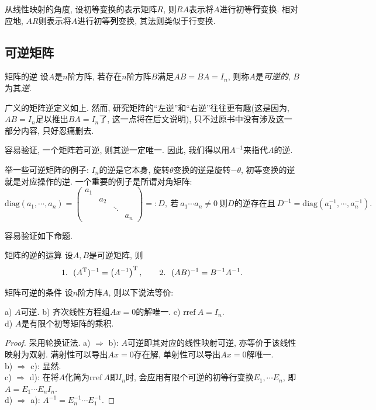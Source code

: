 从线性映射的角度, 设初等变换的表示矩阵$R$, 则$RA$表示将$A$进行初等\textbf{行}变换. 相对应地, $AR$则表示将$A$进行初等\textbf{列}变换, 其法则类似于行变换. 

\subsection{可逆矩阵}

\begin{definition}{矩阵的逆}
	设$A$是$n$阶方阵, 若存在$n$阶方阵$B$满足$AB=BA=I_n$, 则称$A$是\textit{可逆的}, $B$为其\textit{逆}. 
\end{definition}
\begin{remark}
	广义的矩阵逆定义如上. 然而, 研究矩阵的“左逆”和“右逆”往往更有趣(这是因为, $AB=I_n$足以推出$BA=I_n$了, 这一点将在后文说明), 只不过原书中没有涉及这一部分内容, 只好忍痛删去. 
\end{remark}

容易验证, 一个矩阵若可逆, 则其逆一定唯一. 因此, 我们得以用$A^{-1}$来指代$A$的逆. 

举一些可逆矩阵的例子: $I_n$的逆是它本身, 旋转$\theta$变换的逆是旋转$-\theta$, 初等变换的逆就是对应操作的逆. 一个重要的例子是所谓对角矩阵: $$\textrm{diag} (a_1, \cdots ,a_n) = \left( \begin{smallmatrix}
	 a_1 &   &   &   \\
	   & a_2 &   &   \\
	   &   &\ddots &   \\
	   &   &   & a_n     
\end{smallmatrix} \right)=:D,~\textit{若}~a_1\cdots a_n \neq 0~\textit{则$D$的逆存在且} ~D^{-1} = \textrm{diag} (a_1^{-1},\cdots ,a_n^{-1}). $$

容易验证如下命题. 

\begin{proposition}{矩阵的逆的运算}
	设$A,B$是可逆矩阵, 则$$1.~~(A^{\operatorname{T}})^{-1} = \left(A^{-1}\right)^{\operatorname{T}} ,\qquad 2.~~(AB)^{-1}=B^{-1}A^{-1}.$$
\end{proposition}

\begin{proposition}{矩阵可逆的条件}
	设$n$阶方阵$A$, 则以下说法等价:
	\begin{center}
		a) $A$可逆. \qquad b) 齐次线性方程组$Ax=0$的解唯一. \qquad c) $\textrm{rref}~ A=I_n$. \\ d) $A$是有限个初等矩阵的乘积. 
	\end{center}
\end{proposition}
\begin{proof}
	采用轮换证法. 
	a) $\Rightarrow $ b): $A$可逆即其对应的线性映射可逆, 亦等价于该线性映射为双射. 满射性可以导出$Ax=0$存在解, 单射性可以导出$Ax=0$解唯一. \\
	b) $\Rightarrow $ c): 显然. \\
	c) $\Rightarrow $ d): 在将$A$化简为$\textrm{rref}~A$即$I_n$时, 会应用有限个可逆的初等行变换$E_1,\cdots E_n$, 即$A=E_1\cdots E_nI_n$. \\
	d) $\Rightarrow $ a): $A^{-1} = E_n^{-1}\cdots E_1^{-1}$. 
\end{proof}

